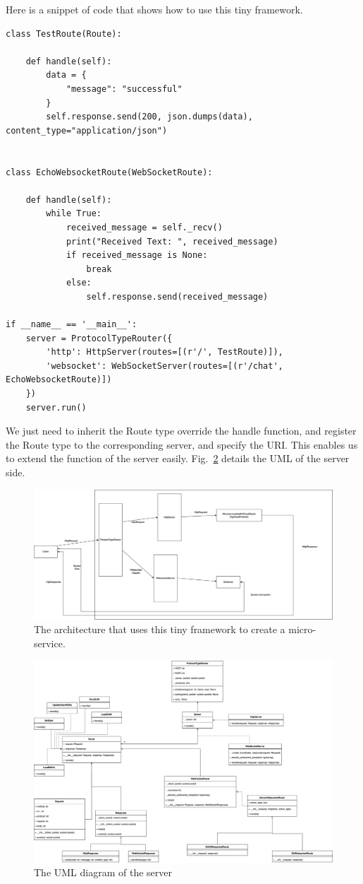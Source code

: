 \documentclass[11pt, oneside]{article}   	%
\begin{document}
Here is a snippet of code that shows how to use this tiny framework.
\begin{verbatim}
class TestRoute(Route):

    def handle(self):
        data = {
            "message": "successful"
        }
        self.response.send(200, json.dumps(data), content_type="application/json")


class EchoWebsocketRoute(WebSocketRoute):

    def handle(self):
        while True:
            received_message = self._recv()
            print("Received Text: ", received_message)
            if received_message is None:
                break
            else:
                self.response.send(received_message)
                
if __name__ == '__main__':
    server = ProtocolTypeRouter({
        'http': HttpServer(routes=[(r'/', TestRoute)]),
        'websocket': WebSocketServer(routes=[(r'/chat', EchoWebsocketRoute)])
    })
    server.run()
\end{verbatim}
We just need to inherit the Route type override the handle function, and register the Route type to the corresponding server, and specify the URI.
This enables us to extend the function of the server easily. Fig.~\ref{serveruml} details the UML of the server side.

\begin{figure}[h]
\centering
\includegraphics[width=\textwidth]{framework}
\caption{The architecture that uses this tiny framework to create a micro-service.}
\label{framework}
\end{figure}

\begin{figure}[h]
\centering
\includegraphics[width=\textwidth]{serverUML}
\caption{The UML diagram of the server}
\label{serveruml}
\end{figure}
\end{document}
